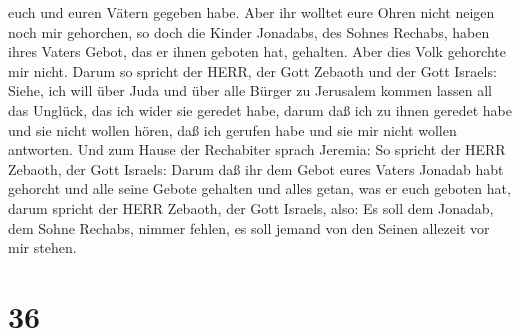 euch und euren Vätern gegeben habe. Aber ihr wolltet eure Ohren nicht
neigen noch mir gehorchen,  so doch die Kinder Jonadabs,
des Sohnes Rechabs, haben ihres Vaters Gebot, das er ihnen geboten hat,
gehalten. Aber dies Volk gehorchte mir nicht.  Darum so
spricht der HERR, der Gott Zebaoth und der Gott Israels: Siehe, ich will
über Juda und über alle Bürger zu Jerusalem kommen lassen all das
Unglück, das ich wider sie geredet habe, darum daß ich zu ihnen geredet
habe und sie nicht wollen hören, daß ich gerufen habe und sie mir nicht
wollen antworten.  Und zum Hause der Rechabiter sprach
Jeremia: So spricht der HERR Zebaoth, der Gott Israels: Darum daß ihr
dem Gebot eures Vaters Jonadab habt gehorcht und alle seine Gebote
gehalten und alles getan, was er euch geboten hat,  darum
spricht der HERR Zebaoth, der Gott Israels, also: Es soll dem Jonadab,
dem Sohne Rechabs, nimmer fehlen, es soll jemand von den Seinen allezeit
vor mir stehen.

\hypertarget{section-35}{%
\section{36}\label{section-35}}

